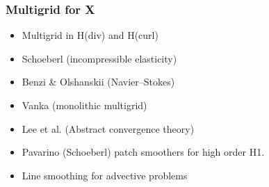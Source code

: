 \documentclass[presentation,aspectratio=43]{beamer}
\begin{document}
\begin{frame}
  \frametitle{Multigrid for X}
  \begin{itemize}
  \item Multigrid in H(div) and H(curl)
  \item Schoeberl (incompressible elasticity)
  \item Benzi \& Olshanskii (Navier--Stokes)
  \item Vanka (monolithic multigrid)
  \item Lee et al. (Abstract convergence theory)
  \item Pavarino (Schoeberl) patch smoothers for high order H1.
  \item Line smoothing for advective problems
  \end{itemize}
\end{frame}
\end{document}
